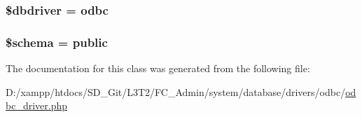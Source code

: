 \subsubsection[{\$dbdriver}]{\setlength{\rightskip}{0pt plus 5cm}\$dbdriver = \textquotesingle{}odbc\textquotesingle{}}\label{class_c_i___d_b__odbc__driver_a0cde2a16322a023d040aa7f725877597}
\hypertarget{class_c_i___d_b__odbc__driver_a83022b1d70799d2bde3d64dca9cb40ee}{}
\subsubsection[{\$schema}]{\setlength{\rightskip}{0pt plus 5cm}\$schema = \textquotesingle{}public\textquotesingle{}}\label{class_c_i___d_b__odbc__driver_a83022b1d70799d2bde3d64dca9cb40ee}


The documentation for this class was generated from the following file\+:\begin{DoxyCompactItemize}
\item 
D\+:/xampp/htdocs/\+S\+D\+\_\+\+Git/\+L3\+T2/\+F\+C\+\_\+\+Admin/system/database/drivers/odbc/\hyperlink{odbc__driver_8php}{odbc\+\_\+driver.\+php}\end{DoxyCompactItemize}
